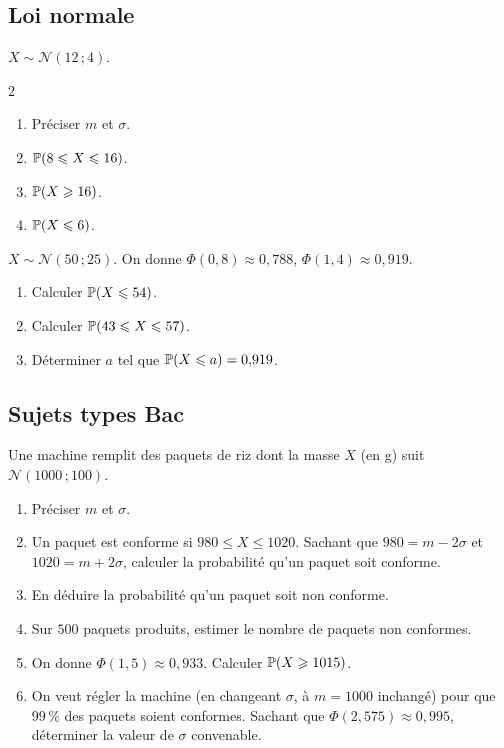 \subsection{Loi normale}

$X\sim\mathscr{N}(12\,;4)$.
\begin{multicols}{2}
\begin{enumerate}
	\item Préciser $m$ et $\sigma$.
	\item $\mathbb{P}(8\leqslant X\leqslant 16)$.
	\item $\mathbb{P}(X\geqslant 16)$.
	\item $\mathbb{P}(X\leqslant 6)$.
\end{enumerate}
\end{multicols}

$X\sim\mathscr{N}(50\,;25)$. On donne $\Phi(0{,}8)\approx 0{,}788$,
$\Phi(1{,}4)\approx 0{,}919$.
\begin{enumerate}
	\item Calculer $\mathbb{P}(X\leqslant 54)$.
	\item Calculer $\mathbb{P}(43\leqslant X\leqslant 57)$.
	\item Déterminer $a$ tel que $\mathbb{P}(X\leqslant a)=0{,}919$.
\end{enumerate}

\subsection{Sujets types Bac}

Une machine remplit des paquets de riz dont la masse $X$ (en g) suit
$\mathscr{N}(1000\,;100)$.
\begin{enumerate}
	\item Préciser $m$ et $\sigma$.
	\item Un paquet est conforme si $980\leqslant X\leqslant 1020$. Sachant que
	$980 = m-2\sigma$ et $1020 = m+2\sigma$, calculer la probabilité qu'un
	paquet soit conforme.
	\item En déduire la probabilité qu'un paquet soit non conforme.
	\item Sur $500$ paquets produits, estimer le nombre de paquets non
	conformes.
	\item On donne $\Phi(1{,}5)\approx 0{,}933$. Calculer $\mathbb{P}(X\geqslant
	1015)$.
	\item On veut régler la machine (en changeant $\sigma$, à $m=1000$
	inchangé) pour que $99\,\%$ des paquets soient conformes. Sachant que
	$\Phi(2{,}575)\approx 0{,}995$, déterminer la valeur de $\sigma$
	convenable.
\end{enumerate}

